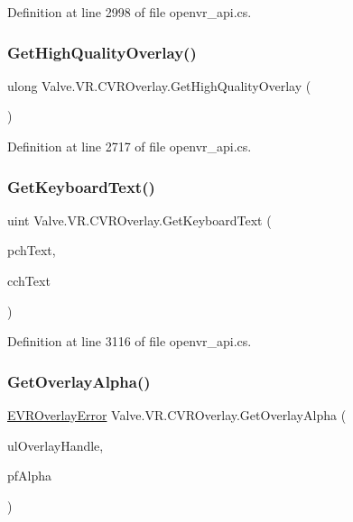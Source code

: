 Definition at line 2998 of file openvr\+\_\+api.\+cs.

\mbox{\label{class_valve_1_1_v_r_1_1_c_v_r_overlay_a26e9c3454ecc7acb77311e21b0c1da6b}} 
\subsubsection{\texorpdfstring{GetHighQualityOverlay()}{GetHighQualityOverlay()}}
{\footnotesize\ttfamily ulong Valve.\+V\+R.\+C\+V\+R\+Overlay.\+Get\+High\+Quality\+Overlay (\begin{DoxyParamCaption}{ }\end{DoxyParamCaption})}



Definition at line 2717 of file openvr\+\_\+api.\+cs.

\mbox{\label{class_valve_1_1_v_r_1_1_c_v_r_overlay_a7615afd64ce4f563313b3db7284d0d54}} 
\subsubsection{\texorpdfstring{GetKeyboardText()}{GetKeyboardText()}}
{\footnotesize\ttfamily uint Valve.\+V\+R.\+C\+V\+R\+Overlay.\+Get\+Keyboard\+Text (\begin{DoxyParamCaption}\item[{System.\+Text.\+String\+Builder}]{pch\+Text,  }\item[{uint}]{cch\+Text }\end{DoxyParamCaption})}



Definition at line 3116 of file openvr\+\_\+api.\+cs.

\mbox{\label{class_valve_1_1_v_r_1_1_c_v_r_overlay_aaa54b1fb8ac9ad522c89d714e56e607c}} 
\subsubsection{\texorpdfstring{GetOverlayAlpha()}{GetOverlayAlpha()}}
{\footnotesize\ttfamily \mbox{\hyperlink{namespace_valve_1_1_v_r_aaee5c5144f42b7969d45b854f51b0c18}{E\+V\+R\+Overlay\+Error}} Valve.\+V\+R.\+C\+V\+R\+Overlay.\+Get\+Overlay\+Alpha (\begin{DoxyParamCaption}\item[{ulong}]{ul\+Overlay\+Handle,  }\item[{ref float}]{pf\+Alpha }\end{DoxyParamCaption})}




